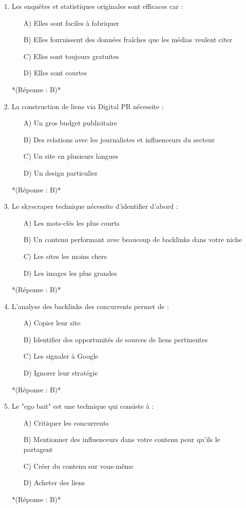 \documentclass[12pt,a4paper,twoside]{report}
\begin{document}
\begin{enumerate}
\item Les enquêtes et statistiques originales sont efficaces car :
\begin{itemize}
\item[A)] Elles sont faciles à fabriquer
\item[B)] Elles fournissent des données fraîches que les médias veulent citer
\item[C)] Elles sont toujours gratuites
\item[D)] Elles sont courtes
\end{itemize}
*(Réponse : B)*

\item La construction de liens via Digital PR nécessite :
\begin{itemize}
\item[A)] Un gros budget publicitaire
\item[B)] Des relations avec les journalistes et influenceurs du secteur
\item[C)] Un site en plusieurs langues
\item[D)] Un design particulier
\end{itemize}
*(Réponse : B)*

\item Le skyscraper technique nécessite d'identifier d'abord :
\begin{itemize}
\item[A)] Les mots-clés les plus courts
\item[B)] Un contenu performant avec beaucoup de backlinks dans votre niche
\item[C)] Les sites les moins chers
\item[D)] Les images les plus grandes
\end{itemize}
*(Réponse : B)*

\item L'analyse des backlinks des concurrents permet de :
\begin{itemize}
\item[A)] Copier leur site
\item[B)] Identifier des opportunités de sources de liens pertinentes
\item[C)] Les signaler à Google
\item[D)] Ignorer leur stratégie
\end{itemize}
*(Réponse : B)*

\item Le "ego bait" est une technique qui consiste à :
\begin{itemize}
\item[A)] Critiquer les concurrents
\item[B)] Mentionner des influenceurs dans votre contenu pour qu'ils le partagent
\item[C)] Créer du contenu sur vous-même
\item[D)] Acheter des liens
\end{itemize}
*(Réponse : B)*


\end{enumerate}
\end{document}
